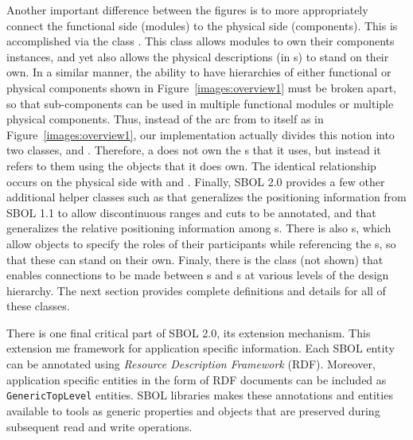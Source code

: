 Another important difference between the figures is to more appropriately connect the functional side (modules) to the physical side (components). This is accomplished via the class . This class allows modules to own their components instances, and yet also allows the physical descriptions (in s) to stand on their own. In a similar manner, the ability to have hierarchies of either functional or physical components shown in Figure~\ref{images:overview1} must be broken apart, so that sub-components can be used in multiple functional modules or multiple physical components. Thus, instead of the arc from  to itself as in Figure~\ref{images:overview1}, our implementation actually divides this notion into two classes,  and . Therefore, a  does not own the s that it uses, but instead it refers to them using the  objects that it does own.  The identical relationship occurs on the physical side with  and . Finally, SBOL 2.0 provides a few other additional helper classes such as  that generalizes the positioning information from SBOL 1.1 to allow discontinuous ranges and cuts to be annotated, and  that generalizes the relative positioning information among s.  There is also 
s, which allow  objects to specify the roles of their participants while referencing the s, so that these can stand on their own. Finaly, there is the  class (not shown) that enables connections to be made between s and s at various levels of the design hierarchy.  The next section provides complete definitions and details for all of these classes.

There is one final critical part of SBOL 2.0, its extension mechanism.  This extension me framework for application specific information. Each SBOL entity can be annotated using \emph{Resource Description Framework} (RDF). Moreover, application specific entities in the form of RDF documents can be included as \texttt{GenericTopLevel} entities. SBOL libraries makes these annotations and entities available to tools as generic properties and objects that are preserved during subsequent read and write operations. 


